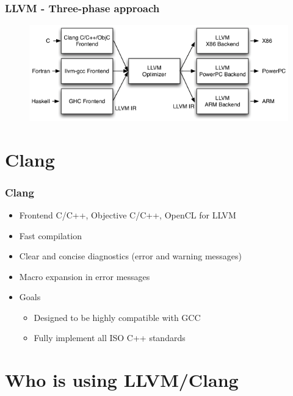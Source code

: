 \documentclass{beamer}
\begin{document}
\begin{frame}
\frametitle{LLVM - Three-phase approach}
\begin{figure}
\includegraphics[width=0.8\linewidth]{img/llvm_struct.png}
\end{figure}
\end{frame}
\section{Clang}

\begin{frame}
\frametitle{Clang}
\begin{itemize}
  \item Frontend C/C++, Objective C/C++, OpenCL for LLVM
  \item Fast compilation
  \item Clear and concise diagnostics (error and warning messages)
  \item Macro expansion in error messages
  \item Goals
  \begin{itemize}
    \item Designed to be highly compatible with GCC
    \item Fully implement all ISO C++ standards
  \end{itemize}
\end{itemize}
\end{frame}
\section{Who is using LLVM/Clang}
\end{document}
